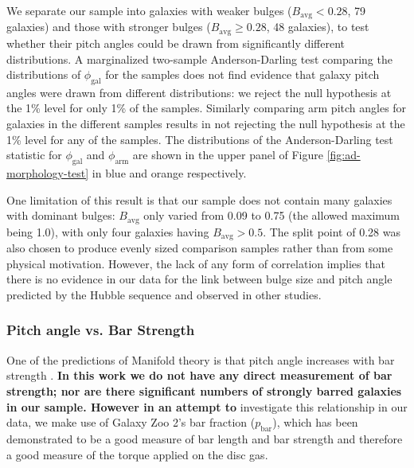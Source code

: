 We separate our sample into galaxies with weaker bulges ($B_\mathrm{avg} < 0.28$, 79 galaxies) and those with stronger bulges ($B_\mathrm{avg} \ge 0.28$, 48 galaxies), to test whether their pitch angles could be drawn from significantly different distributions. A marginalized two-sample Anderson-Darling test comparing the distributions of $\phi_\mathrm{gal}$ for the samples does not find evidence that galaxy pitch angles were drawn from different distributions: we reject the null hypothesis at the 1\% level for only 1\% of the samples. Similarly comparing arm pitch angles for galaxies in the different samples results in not rejecting the null hypothesis at the 1\% level for any of the samples. The distributions of the Anderson-Darling test statistic for $\phi_\mathrm{gal}$ and $\phi_\mathrm{arm}$ are shown in the upper panel of Figure \ref{fig:ad-morphology-test} in blue and orange respectively.

One limitation of this result is that our sample does not contain many galaxies with dominant bulges: $B_\mathrm{avg}$ only varied from 0.09 to 0.75 (the allowed maximum being 1.0), with only four galaxies having $B_\mathrm{avg} > 0.5$. The split point of 0.28 was also chosen to produce evenly sized comparison samples rather than from some physical motivation. However, the lack of any form of correlation implies that there is no evidence in our data for the link between bulge size and pitch angle predicted by the Hubble sequence and observed in other studies.

\subsubsection{Pitch angle vs. Bar Strength}
\label{section:morphology-comparison-bar}

One of the predictions of Manifold theory is that pitch angle increases with bar strength \citep{2009MNRAS.400.1706A}. \textbf{In this work we do not have any direct measurement of bar strength; nor are there significant numbers of strongly barred galaxies in our sample. However in an attempt to} investigate this relationship in our data, we make use of Galaxy Zoo 2's bar fraction ($p_\mathrm{bar}$), which has been demonstrated to be a good measure of bar length \citep{Willett2013:1308.3496v2} and bar strength \citep{2012MNRAS.423.1485S,2012MNRAS.424.2180M,2018MNRAS.473.4731K} and therefore a good measure of the torque applied on the disc gas.

